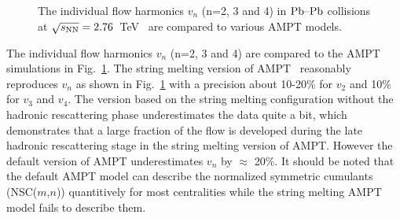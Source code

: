 \begin{figure}[h]
\begin{center}
        \caption{The individual flow harmonics $v_n$ (n=2, 3 and 4) in $\textnormal{Pb--Pb}$ collisions at $\sqrt{s_{\textnormal{NN}}}=2.76$~TeV~\cite{Adam:2016izf} are compared to various AMPT models.}
        \label{fig:Figure_10}
              \end{center}
\end{figure}

The individual flow harmonics $v_n$ (n=2, 3 and 4) are compared to the {AMPT} simulations in Fig.~\ref{fig:Figure_10}.
The string melting version of AMPT~\cite{Lin:2001zk,Lin:2004en} reasonably reproduces $v_n$ as shown in Fig.~\ref{fig:Figure_10} with a precision about 10-20\% for $v_2$ and 10\% for $v_3$ and $v_4$. The version based on the string melting configuration without the hadronic rescattering phase underestimates the data quite a bit, which demonstrates that a large fraction of the flow is developed during the late hadronic rescattering stage in the string melting version of AMPT.
However the default version of AMPT underestimates $v_n$ by $\approx$ 20\%. It should be noted that the default AMPT model can describe the normalized symmetric cumulants (NSC($m$,$n$)) quantitively for most centralities while the string melting AMPT model fails to describe them.

